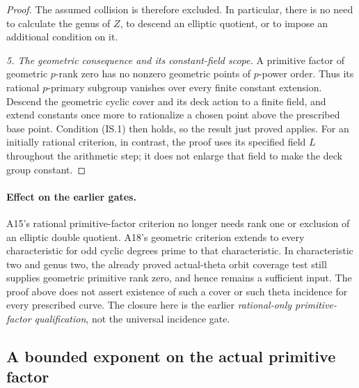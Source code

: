 \documentclass[11pt,a4paper]{article}
\begin{document}
\begin{proof}
The assumed collision is therefore excluded. In particular,
there is no need to calculate the genus of $Z$, to descend an
elliptic quotient, or to impose an additional condition on it.

\emph{5. The geometric consequence and its constant-field scope.}
A primitive factor of geometric $p$-rank zero has no nonzero
geometric points of $p$-power order. Thus its rational
$p$-primary subgroup vanishes over every finite constant
extension. Descend the geometric cyclic cover and its deck
action to a finite field, and extend constants once more to
rationalize a chosen point above the prescribed base point.
Condition (IS.1) then holds, so the result just proved applies.
For an initially rational criterion, in contrast, the proof
uses its specified field $L$ throughout the arithmetic step;
it does not enlarge that field to make the deck group constant.
\end{proof}

\paragraph{Effect on the earlier gates.}
A15's rational primitive-factor criterion no longer needs
rank one or exclusion of an elliptic double quotient. A18's
geometric criterion extends to every characteristic for odd
cyclic degrees prime to that characteristic. In characteristic
two and genus two, the already proved actual-theta orbit
coverage test still supplies geometric primitive rank zero,
and hence remains a sufficient input. The proof above does
not assert existence of such a cover or such theta incidence
for every prescribed curve. The closure here is the earlier
\emph{rational-only primitive-factor qualification}, not the
universal incidence gate.


\subsection{A bounded exponent on the actual primitive factor}
\label{sec:bounded-primitive-exponent}
\end{document}

